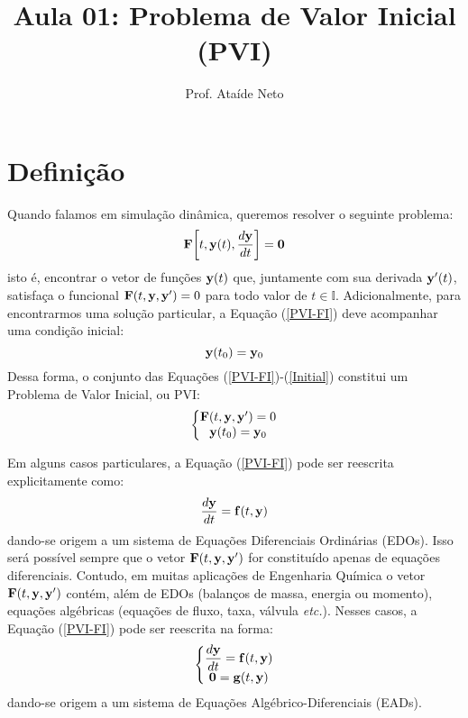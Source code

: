 \documentclass[12pt]{peqdoc}
\title{Aula 01: Problema de Valor Inicial (PVI)}
\author{Prof. Ataíde Neto}
\begin{document}
	
	\maketitle
	
	\section{Definição}
	
	Quando falamos em simulação dinâmica, queremos resolver o seguinte problema:
	\begin{equation}
	\mathbf{F}\bigg[t,\mathbf{y}(t),\frac{d\mathbf{y}}{dt}\bigg] = \mathbf{0} \label{PVI-FI}
	\end{equation}
	\noindent isto é, encontrar o vetor de funções $\mathbf{y}(t)$ que, juntamente com sua derivada $\mathbf{y}'(t)$, satisfaça o funcional $\mathbf{F}(t,\mathbf{y},\mathbf{y}')=0$ para todo valor de $t\in\mathbb{I}$.
	Adicionalmente, para encontrarmos uma solução particular, a Equação (\ref{PVI-FI}) deve acompanhar uma condição inicial:
	\begin{equation}
	\mathbf{y}(t_0) = \mathbf{y}_0\label{Initial}
	\end{equation} 
	\noindent Dessa forma, o conjunto das Equações (\ref{PVI-FI})-(\ref{Initial}) constitui um Problema de Valor Inicial, ou PVI:
	\begin{equation}
	\left\{\begin{matrix}
	\mathbf{F}(t,\mathbf{y},\mathbf{y}') = 0\\ \mathbf{y}(t_0) = \mathbf{y}_0
	\end{matrix}\right.
	\end{equation}
	
	Em alguns casos particulares, a Equação (\ref{PVI-FI}) pode ser reescrita explicitamente como:
	\begin{equation}
	\frac{d\mathbf{y}}{dt} = \mathbf{f}(t,\mathbf{y})\label{EDO}
	\end{equation}
	\noindent dando-se origem a um sistema de Equações Diferenciais Ordinárias (EDOs). Isso será possível sempre que o vetor $\mathbf{F}(t,\mathbf{y},\mathbf{y}')$ for constituído apenas de equações diferenciais. Contudo, em muitas aplicações de Engenharia Química o vetor $\mathbf{F}(t,\mathbf{y},\mathbf{y}')$ contém, além de EDOs (balanços de massa, energia ou momento), equações algébricas (equações de fluxo, taxa, válvula \textit{etc.}). Nesses casos, a Equação (\ref{PVI-FI}) pode ser reescrita na forma:
	\begin{equation}
	\left\{\begin{matrix}
	\displaystyle\frac{d\mathbf{y}}{dt} = \mathbf{f}(t,\mathbf{y}) \\ \mathbf{0} = \mathbf{g}(t,\mathbf{y})
	\end{matrix}\right.\label{EAD}
	\end{equation}
	\noindent dando-se origem a um sistema de Equações Algébrico-Diferenciais (EADs).
	
\end{document}
